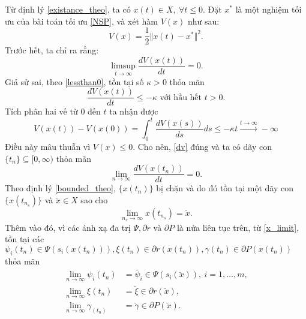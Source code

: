 \begin{cm}
    Từ định lý \ref{existance_theo}, ta có $x(t) \in X,\ \forall t \leq 0$. Đặt $x^*$ là một nghiệm tối ưu của bài toán tối ưu \eqref{NSP}, và xét hàm $V(x)$ như sau:
    \begin{equation}
        V(x) = \dfrac{1}{2} \Vert x(t) - x^* \Vert^2.
    \end{equation}
    Trước hết, ta chỉ ra rằng:
    \begin{equation}
        \label{dv}
        \limsup_{t \to \infty} \dfrac{dV(x(t))}{dt} = 0.
    \end{equation}
    Giả sử sai, theo \eqref{lessthan0}, tồn tại số $\kappa > 0$ thỏa mãn
    \begin{equation}
        \dfrac{dV(x(t))}{dt} \leq -\kappa \text{ với hầu hết } t > 0.
    \end{equation}
    Tích phân hai vế từ $0$ đến $t$ ta nhận được
    \begin{equation}
        V(x(t)) - V(x(0)) = \int_{0}^{t} \dfrac{dV(x(s))}{ds} ds \leq -\kappa t \xrightarrow{t \to \infty} -\infty 
    \end{equation}
    Điều này mâu thuẫn vì $V(x) \leq 0$. Cho nên, \eqref{dv} đúng và ta có dãy con $\{t_n \} \subseteq [0, \infty)$ thỏa mãn
    \begin{equation}
        \label{lim_d}
        \lim_{n \to \infty} \dfrac{dV(x(t_n))}{dt} = 0.
    \end{equation}
    Theo định lý \ref{bounded_theo}, $\{x(t_n)\}$ bị chặn và do đó tồn tại một dãy con $\{x(t_{n_s}) \}$ và $\breve{x}\in X $ sao cho
    \begin{equation}
        \label{x_limit}
        \lim_{n_s \to \infty} x(t_{n_s}) = \breve{x}.
    \end{equation}
    Thêm vào đó, vì các ánh xạ đa trị $\Psi, \partial r$ và $\partial P$ là nửa liên tục trên, từ \eqref{x_limit}, tồn tại các $\psi_i(t_n) \in \Psi(s_i(x(t_n))), \xi(t_n) \in \partial r(x(t_n)), \gamma(t_n) \in \partial P(x(t_n))$ thỏa mãn
    \begin{equation}
        \label{limits}
        \begin{aligned}
            \lim_{n \to \infty} \psi_i(t_n)  &= \breve{\psi_i} \in \Psi(s_i(\breve{x})),\ i = 1, \dots, m,\\
            \lim_{n \to \infty} \xi(t_n) &= \breve{\xi} \in \partial r(\breve{x}), \\
            \lim_{n \to \infty} \gamma_(t_n) &= \breve{\gamma} \in \partial P(\breve{x}).
        \end{aligned}

\end{equation}
\end{cm}
